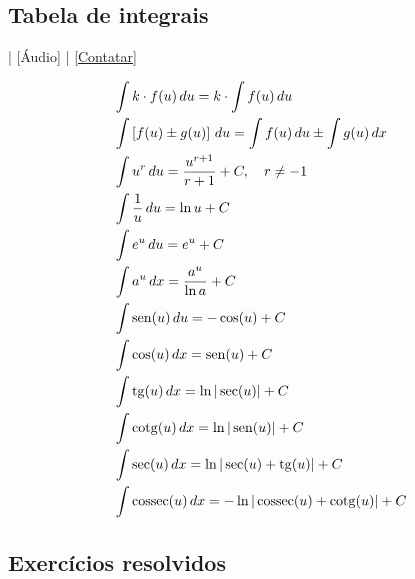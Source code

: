 \subsection{Tabela de integrais}

\begin{flushright}
  [Vídeo] | [Áudio] | \href{https://phkonzen.github.io/notas/contato.html}{[Contatar]}
\end{flushright}

\begin{small}
\begin{align}
  & \int k\cdot f(u)\,du = k\cdot\int f(u)\,du\\
  & \int \left[f(u)\pm g(u)\right]\,du = \int f(u)\,du \pm \int g(u)\,dx\\
  & \int u^r\,du = \frac{u^{r+1}}{r+1} + C,\quad r\neq -1\\
  & \int \frac{1}{u}\,du = \ln u + C \\
  & \int e^u\,du = e^u + C \\
  & \int a^u\,dx = \frac{a^u}{\ln a} + C \\
  & \int \operatorname{sen}(u)\,du = -\cos(u) + C \\
  & \int \cos(u)\,dx = \operatorname{sen}(u) + C \\
  & \int \operatorname{tg}(u)\,dx = \ln|\sec(u)| + C \\
  & \int \operatorname{cotg}(u)\,dx = \ln|\operatorname{sen}(u)| + C \\
  & \int \sec(u)\,dx = \ln|\sec(u)+\operatorname{tg}(u)| + C \\
  & \int \operatorname{cossec}(u)\,dx = -\ln|\operatorname{cossec}(u)+\operatorname{cotg}(u)| + C
\end{align}
\end{small}


\subsection{Exercícios resolvidos}


